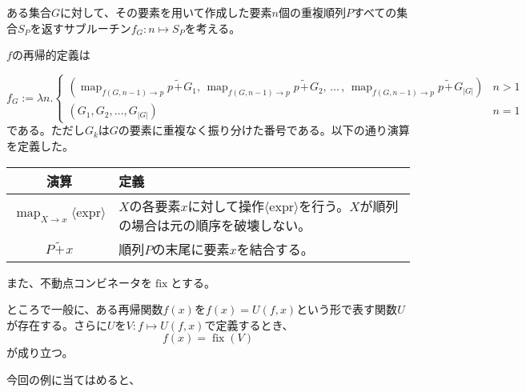 \documentclass[uplatex,a4paper,dvipdfmx]{jsarticle}
\title{}
\author{}
\DeclareMathOperator*{\map}{map}
\DeclareMathOperator*{\fix}{fix}
\newcommand{\append}{\hspace{1pt} \tilde{+} \hspace{1pt}}
\begin{document}
    ある集合$G$に対して、その要素を用いて作成した要素$n$個の重複順列$P$すべての集合$S_P$を返すサブルーチン$f_G:n \mapsto S_P$を考える。

    $f$の再帰的定義は

    \begin{equation*}
        f_G := \lambda n. \left\{
            \begin{array}{lc}
                \displaystyle \left( \map_{f(G,n-1) \to p} p \append G_1,\, \map_{f(G,n-1) \to p} p \append G_2,\, \ldots \,,\,\map_{f(G,n-1) \to p} p \append G_{\left| G \right|} \right) & n > 1 \\
                \left(G_1, G_2, \ldots, G_{\left| G \right|}\right) & n = 1
            \end{array}
            \right.
    \end{equation*}
    である。ただし$G_k$は$G$の要素に重複なく振り分けた番号である。以下の通り演算を定義した。

    \begin{table}[H]
        \centering
        \begin{tabular}{c|l} \hline
            演算 & 定義 \\ \hline
            $\displaystyle \map_{X \to x} \langle \text{expr} \rangle$ & $X$の各要素$x$に対して操作$\langle \text{expr} \rangle$を行う。$X$が順列の場合は元の順序を破壊しない。 \\ \hline
            $P \append x$ & 順列$P$の末尾に要素$x$を結合する。 \\ \hline
        \end{tabular}
    \end{table}

    また、不動点コンビネータを$\fix$とする。

    ところで一般に、ある再帰関数$f(x)$を$f(x) = U(f,x)$という形で表す関数$U$が存在する。さらに$U$を$V: f \mapsto U(f,x)$で定義するとき、
    \begin{equation}
        f(x) = \fix(V) \tag{Lem.}
    \end{equation}
    が成り立つ。

    今回の例に当てはめると、
\end{document}
